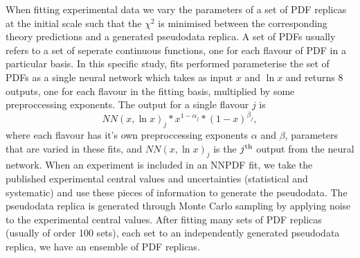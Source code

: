 When fitting experimental data we vary the parameters of a set of PDF replicas
at the initial scale such that the $\chi^2$ is minimised between the
corresponding theory predictions and a generated pseudodata replica. A set of
PDFs usually refers to a set of seperate continuous functions, one for each
flavour of PDF in a particular basis. In this specific study, fits performed
parameterise the set of PDFs as a single neural network which takes
as input $x$ and $\ln x$ and returns 8 outputs, one for each flavour in the
fitting basis, multiplied by some preproccessing exponents. The output for a
single flavour $j$ is
\begin{equation}
    NN(x, \ln x)_j * x^{1-\alpha_j} * (1-x)^{\beta_j},
\end{equation}
where each flavour has it's own preproccessing exponents $\alpha$ and $\beta$,
parameters that are varied in these fits, and $NN(x, \ln x)_j$ is the
$j^{\rm th}$ output from the neural network.
When an experiment is included in an NNPDF fit, we take the published
experimental central values and uncertainties (statistical and systematic)
and use these pieces of information to generate the pseudodata.
The pseudodata replica is generated
through Monte Carlo sampling by applying noise to the experimental
central values.
After fitting many sets of PDF replicas (usually of order 100 sets),
each set to an independently generated pseudodata replica, we have an ensemble of
PDF replicas.

